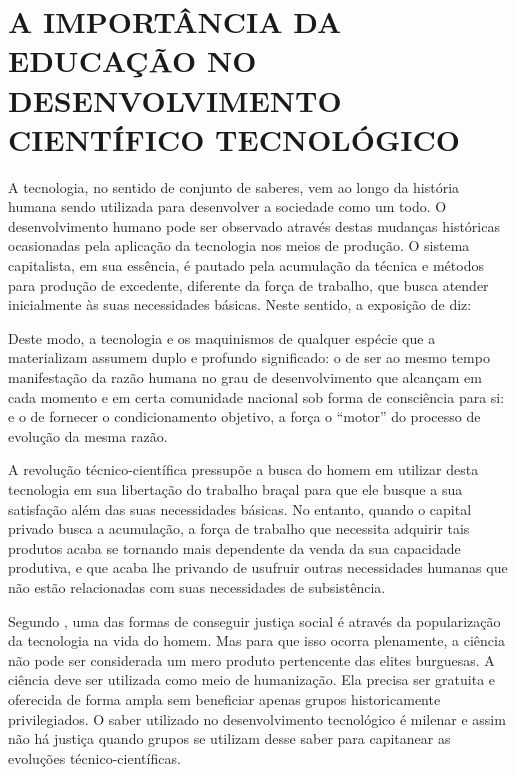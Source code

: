 \chapter{A IMPORTÂNCIA DA EDUCAÇÃO NO DESENVOLVIMENTO CIENTÍFICO TECNOLÓGICO}
\label{chap:importancia}

A tecnologia, no sentido de conjunto de saberes, vem ao longo da história humana sendo utilizada para desenvolver a sociedade como um todo. O desenvolvimento humano pode ser observado através destas mudanças históricas ocasionadas pela aplicação da tecnologia nos meios de produção. O sistema capitalista, em sua essência, é pautado pela acumulação da técnica e métodos para produção de excedente, diferente da força de trabalho, que busca atender inicialmente às suas necessidades básicas. Neste sentido, a exposição de \cite{vieira2005conceito} diz:

\begin{citacao}
 Deste modo, a tecnologia e os maquinismos de qualquer espécie que a materializam assumem duplo e profundo significado: o de ser ao mesmo tempo manifestação da razão humana no grau de desenvolvimento que alcançam em cada momento e em certa comunidade nacional sob forma de consciência para si: e o de fornecer o condicionamento objetivo, a força o ``motor'' do processo de evolução da mesma razão.
\end{citacao}

A revolução técnico-científica pressupõe a busca do homem em utilizar desta tecnologia em sua libertação do trabalho braçal para que ele busque a sua satisfação além das suas necessidades básicas. No entanto, quando o capital privado busca a acumulação, a força de trabalho que necessita adquirir tais produtos acaba se tornando mais dependente da venda da sua capacidade produtiva, e que acaba lhe privando de usufruir outras necessidades humanas que não estão relacionadas com suas necessidades de subsistência.

Segundo \cite{vieira2005conceito}, uma das formas de conseguir justiça social é através da popularização da tecnologia na vida do homem. Mas para que isso ocorra plenamente, a ciência não pode ser considerada um mero produto pertencente das elites burguesas. A ciência deve ser utilizada como meio de humanização. Ela precisa ser gratuita e oferecida de forma ampla sem beneficiar apenas grupos historicamente privilegiados. O saber utilizado no desenvolvimento tecnológico é milenar e assim não há justiça quando grupos se utilizam desse saber para capitanear as evoluções técnico-científicas.

